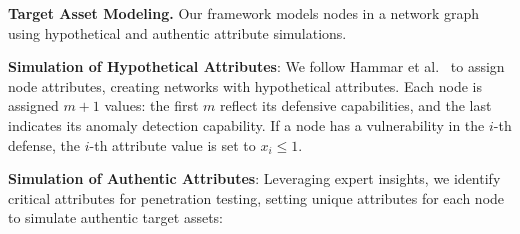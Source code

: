 \textbf{Target Asset Modeling.}
Our framework models nodes in a network graph using hypothetical and authentic attribute simulations.

\textbf{Simulation of Hypothetical Attributes}: We follow Hammar et al.~\cite{2020Finding} to assign node attributes, creating networks with hypothetical attributes. Each node is assigned $m+1$ values: the first $m$ reflect its defensive capabilities, and the last indicates its anomaly detection capability. If a node has a vulnerability in the $i$-th defense, the $i$-th attribute value is set to $x_i \leq 1$. 

\textbf{Simulation of Authentic Attributes}: Leveraging expert insights, we identify critical attributes for penetration testing, setting unique attributes for each node to simulate authentic target assets:

